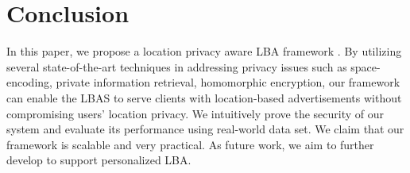 \section{Conclusion}
\label{sec:conclusion}
In this paper, we propose a location privacy aware LBA framework \codename. By utilizing several state-of-the-art techniques in addressing privacy issues such as space-encoding, private information retrieval, homomorphic encryption, our framework can enable the LBAS to serve clients with location-based advertisements without compromising users' location privacy. We intuitively prove the security of our system and evaluate its performance using real-world data set. We claim that our framework is scalable and very practical. As future work, we aim to further develop \codename to support personalized LBA.
